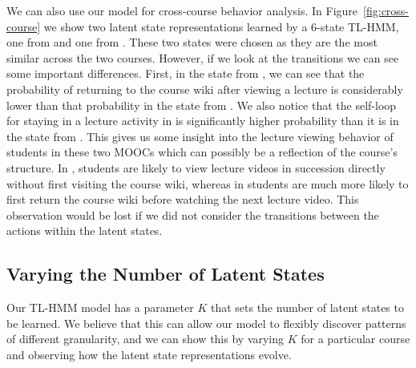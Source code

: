We can also use our model for cross-course behavior analysis. In
Figure~\ref{fig:cross-course} we show two latent state representations
learned by a 6-state TL-HMM, one from \textretrieval{} and one from
\sustain{}. These two states were chosen as they are the most similar
across the two courses. However, if we look at the transitions we can see
some important differences. First, in the state from \textretrieval{}, we
can see that the probability of returning to the course wiki after viewing
a lecture is considerably lower than that probability in the state from
\sustain{}. We also notice that the self-loop for staying in a lecture
activity in \textretrieval{} is significantly higher probability than it is
in the state from \sustain{}. This gives us some insight into the lecture
viewing behavior of students in these two MOOCs which can possibly be a
reflection of the course's structure. In \textretrieval{}, students are
likely to view lecture videos in succession directly without first visiting
the course wiki, whereas in \sustain{} students are much more likely to
first return the course wiki before watching the next lecture video. This
observation would be lost if we did not consider the transitions between
the actions within the latent states.

\subsection{Varying the Number of Latent States}
Our TL-HMM model has a parameter $K$ that sets the number of latent states
to be learned. We believe that this can allow our model to flexibly
discover patterns of different granularity, and we can show this by varying
$K$ for a particular course and observing how the latent state
representations evolve.

